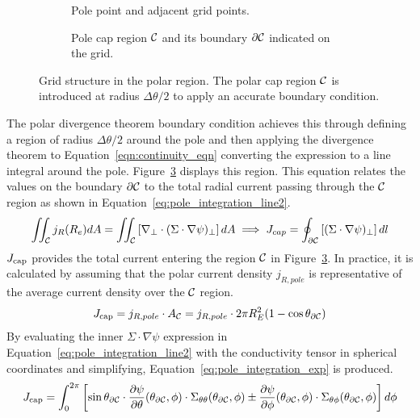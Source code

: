 \begin{figure}[htbp]
	\centering
	\begin{subfigure}[t]{0.48\textwidth}
		\centering
		
		\caption{Pole point and adjacent grid points.}
		\label{diag:pole_behaviour_grid}
	\end{subfigure}
	\hfill
	\begin{subfigure}[t]{0.48\textwidth}
		\centering
		
		\caption{Pole cap region $\mathcal{C}$ and its boundary $\partial\mathcal{C}$ indicated on the grid.}
		\label{diag:pole_behaviour_grid_cap}
	\end{subfigure}
	\caption{Grid structure in the polar region. The polar cap region $\mathcal{C}$ is introduced at radius $\Delta\theta/2$ to apply an accurate boundary condition.}
\end{figure}

The polar divergence theorem boundary condition achieves this through defining a region of radius $\Delta\theta/2$ around the pole and then applying the divergence theorem to Equation~\ref{eqn:continuity_eqn} converting the expression to a line integral around the pole. Figure~\ref{diag:pole_behaviour_grid_cap} displays this region. This equation relates the values on the boundary $\partial\mathcal{C}$ to the total radial current passing through the $\mathcal{C}$ region as shown in Equation~\ref{eq:pole_integration_line2}.
\begin{equation}
	\iint_{\mathcal{C}} j_R(R_e) dA  =\iint_{\mathcal{C}}  \left[\nabla_\perp\cdot (\Sigma\cdot \nabla \psi)_\perp\right]dA
	\implies J_{cap}=\oint_{\partial\mathcal{C}}\left[(\Sigma\cdot \nabla \psi)_\perp\right]dl
	\label{eq:pole_integration_line2}
\end{equation}
$J_{\rm cap}$ provides the total current entering the region $\mathcal{C}$ in Figure~\ref{diag:pole_behaviour_grid_cap}. In practice, it is calculated by assuming that the polar current density $j_{R,pole}$ is representative of the average current density over the $\mathcal{C}$ region.
\begin{equation}
	J_{\rm cap} = j_{R,pole}\cdot A_{\mathcal{C}} = j_{R,pole}\cdot 2\pi R_E^2(1 -\cos\theta_{\partial\mathcal{C}})
\end{equation}
By evaluating the inner $\Sigma \cdot \nabla \psi$ expression in Equation~\ref{eq:pole_integration_line2} with the conductivity tensor in spherical coordinates and simplifying, Equation~\ref{eq:pole_integration_exp} is produced.
\begin{equation}
	J_{\rm cap} = \int_{0}^{2\pi}\left[\sin\theta_{\partial\mathcal{C}}\cdot
		\frac{\partial \psi}{\partial \theta}(\theta_{\partial\mathcal{C}}, \phi)\cdot
		\Sigma_{\theta\theta} (\theta_{\partial\mathcal{C}},\phi)\pm
		\frac{\partial\psi}{\partial\phi}(\theta_{\partial\mathcal{C}},\phi)\cdot
		\Sigma_{\theta\phi}(\theta_{\partial\mathcal{C}},\phi)
		\right] d\phi
	\label{eq:pole_integration_exp}
\end{equation}

